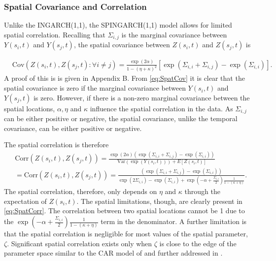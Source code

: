 \documentclass[11pt]{isuthesis}
\begin{document}
\subsubsection{Spatial Covariance and Correlation}
Unlike the INGARCH(1,1), the SPINGARCH(1,1) model allows for limited spatial correlation.  Recalling that $\Sigma_{i,j}$ is the marginal covariance between $Y(s_i,t)$ and $Y(s_j,t)$, the spatial covariance between $Z(s_i,t)$ and $Z(s_j,t)$ is

\begin{align}
	& \mbox{Cov}(Z(s_i,t),Z(s_j,t):\forall i \neq j) =  \frac{\exp(2\alpha)}{1-(\eta+\kappa)^2}\left[\exp(\Sigma_{i,i}+\Sigma_{i,j}) -\exp(\Sigma_{i,i})\right] \label{eq:SpatCov}.
\end{align}
A proof of this is is given in Appendix B.  From \eqref{eq:SpatCov} it is clear that the spatial covariance is zero if the marginal covariance between $Y(s_i,t)$ and $Y(s_j,t)$ is zero.  However, if there is a non-zero marginal covariance between the spatial locations, $\alpha,\eta$ and $\kappa$ influence the spatial correlation in the data. As $\Sigma_{i,j}$ can be either positive or negative, the spatial covariance, unlike the temporal covariance, can be either positive or negative.

The spatial correlation is therefore
\begin{align}
	& \mbox{Corr}(Z(s_i,t),Z(s_j,t))  = \frac{\exp(2\alpha)\left(\exp(\Sigma_{i,i}+\Sigma_{i,j}) -\exp(\Sigma_{i,i})\right)}{\mbox{Var} (\exp(Y(s_i,t)))+E[Z(s_i,t)]}\nonumber \\
	&=\mbox{Corr}(Z(s_i,t),Z(s_j,t))  = \frac{\left(\exp(\Sigma_{i,i}+\Sigma_{i,j}) -\exp(\Sigma_{i,i})\right)}{ \exp(2\Sigma_{i,i})-\exp(\Sigma_{i,i})+\exp(-\alpha+\frac{\Sigma_{i,i}}{2})\frac{1}{1-(\kappa+\eta)}}\label{eq:SpatCorr}.
\end{align}
The spatial correlation, therefore, only depends on $\eta$ and $\kappa$ through the expectation of $Z(s_i,t)$.  The spatial limitations, though, are clearly present in \eqref{eq:SpatCorr}.  The correlation between two spatial locations cannot be 1 due to the $\exp(-\alpha+\frac{\Sigma_{i,i}}{2})\frac{1}{1-(\kappa+\eta)}$ term in the denominator.  A further limitation is that the spatial correlation is negligible for most values of the spatial parameter, $\zeta$.  Significant spatial correlation exists only when $\zeta$ is close to the edge of the parameter space similar to the CAR model of \cite{besag1981system} and further addressed in \cite{wall2004close}.
\end{document}
